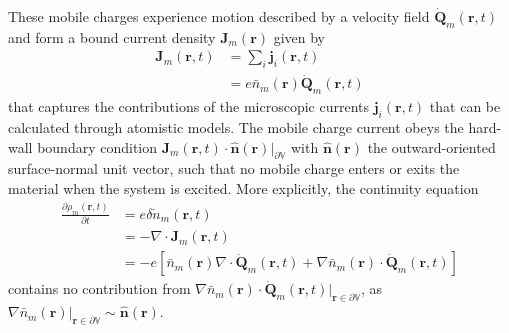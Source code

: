 \documentclass{article}
\begin{document}
These mobile charges experience motion described by a velocity field $\dot{\mathbf{Q}}_m(\mathbf{r},t)$ and form a bound current density $\mathbf{J}_m(\mathbf{r})$ given by
\begin{equation}
\begin{split}
\mathbf{J}_m(\mathbf{r},t) &= \sum_i\mathbf{j}_i(\mathbf{r},t)\\
&= e\bar{n}_m(\mathbf{r})\dot{\mathbf{Q}}_m(\mathbf{r},t)
\end{split}
\end{equation}
that captures the contributions of the microscopic currents $\mathbf{j}_i(\mathbf{r},t)$ that can be calculated through atomistic models. The mobile charge current obeys the hard-wall boundary condition $\mathbf{J}_m(\mathbf{r},t)\cdot\hat{\mathbf{n}}(\mathbf{r})|_{\partial \mathbb{V}}$ with $\hat{\mathbf{n}}(\mathbf{r})$ the outward-oriented surface-normal unit vector, such that no mobile charge enters or exits the material when the system is excited. More explicitly, the continuity equation
\begin{equation}
\begin{split}
\frac{\partial \rho_m(\mathbf{r},t)}{\partial t} &= e\delta \dot{n}_m(\mathbf{r},t)\\
&= -\nabla\cdot\mathbf{J}_m(\mathbf{r},t)\\
&= -e\left[\bar{n}_m(\mathbf{r})\nabla\cdot\dot{\mathbf{Q}}_m(\mathbf{r},t) + \nabla\bar{n}_m(\mathbf{r})\cdot\dot{\mathbf{Q}}_m(\mathbf{r},t)\right]
\end{split}
\end{equation}
contains no contribution from $\nabla\bar{n}_m(\mathbf{r})\cdot\dot{\mathbf{Q}}_m(\mathbf{r},t)|_{\mathbf{r}\in\partial\mathbb{V}}$, as $\nabla\bar{n}_m(\mathbf{r})|_{\mathbf{r}\in\partial\mathbb{V}}\sim\hat{\mathbf{n}}(\mathbf{r})$.
\end{document}

